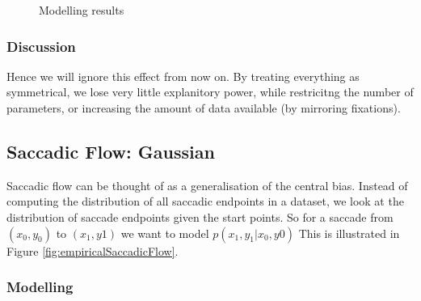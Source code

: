 \documentclass[a4paper, onecolumn, oneside, 11pt]{article}
\begin{document}
\begin{figure}
\centering
{}
\caption{Modelling results}
\label{fig:leftrightModelling}
\end{figure}

\subsubsection{Discussion}

Hence we will ignore this effect from now on. By treating everything as symmetrical, we lose very little explanitory power, while restricitng the number of parameters, or increasing the amount of data available (by mirroring fixations).

\subsection{Saccadic Flow: Gaussian}

Saccadic flow can be thought of as a generalisation of the central bias. Instead of computing the distribution of all saccadic endpoints in a dataset, we look at the distribution of saccade endpoints given the start points. So for a saccade from $(x_0, y_0)$ to $(x_1, y1)$ we want to model $p(x_1,y_1|x_0, y0)$ This is illustrated in Figure \ref{fig:empiricalSaccadicFlow}.


\subsubsection{Modelling}
\end{document}
